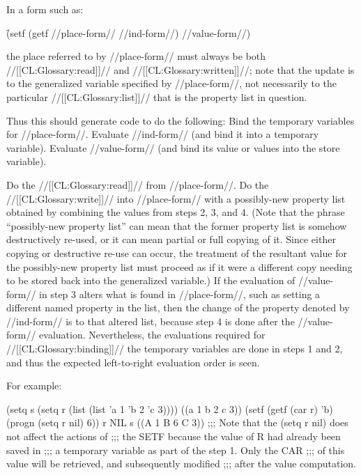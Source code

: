     In a form such as:
 
\f{(setf (getf //place-form// //ind-form//) //value-form//)}
 
    the place referred to by //place-form// must always be both //[[CL:Glossary:read]]//
    and //[[CL:Glossary:written]]//;  note that the update is to the generalized variable 
    specified by //place-form//, not necessarily to the particular 
//[[CL:Glossary:list]]//
that is the property list in question.
 
    Thus this  should generate code to do the following:
\beginlist
{} 
Bind the temporary variables for //place-form//.
Evaluate //ind-form// (and bind it into a temporary variable).
Evaluate //value-form// (and bind 
its value or values into the store variable).



Do the //[[CL:Glossary:read]]// from //place-form//.
Do the //[[CL:Glossary:write]]// into //place-form// with a possibly-new property list
       obtained by combining the values from steps 2, 3, and 4.  
(Note that the phrase ``possibly-new property list'' can mean that 
    the former property list is somehow destructively re-used, or it can 
    mean partial or full copying of it.  
Since either copying or destructive re-use can occur, 
the treatment of the resultant value for the 
    possibly-new property list must proceed as if it were a different copy
    needing to be stored back into the generalized variable.)
\endlist 
    If the evaluation of //value-form// 
in step 3 alters what is found in
//place-form//, such as setting a different named property in the list,
    then the change of the property denoted by //ind-form// 
is to that 
    altered list, because step 4 is done after the 
//value-form//
    evaluation.  Nevertheless, the 
    evaluations required for //[[CL:Glossary:binding]]// 
the temporary variables  are done in steps 1 and 
    2,  and thus the expected left-to-right evaluation order is seen.

For example:

\code
 (setq s (setq r (list (list 'a 1 'b 2 'c 3)))) \EV ((a 1 b 2 c 3))
 (setf (getf (car r) 'b) 
       (progn (setq r nil) 6)) 
 r \EV NIL
 s \EV ((A 1 B 6 C 3))
;;; Note that the (setq r nil) does not affect the actions of 
;;; the SETF because the value of R had already been saved in 
;;; a temporary variable as part of the step 1. Only the CAR
;;; of this value will be retrieved, and subsequently modified 
;;; after the value computation.
\endcode
 

